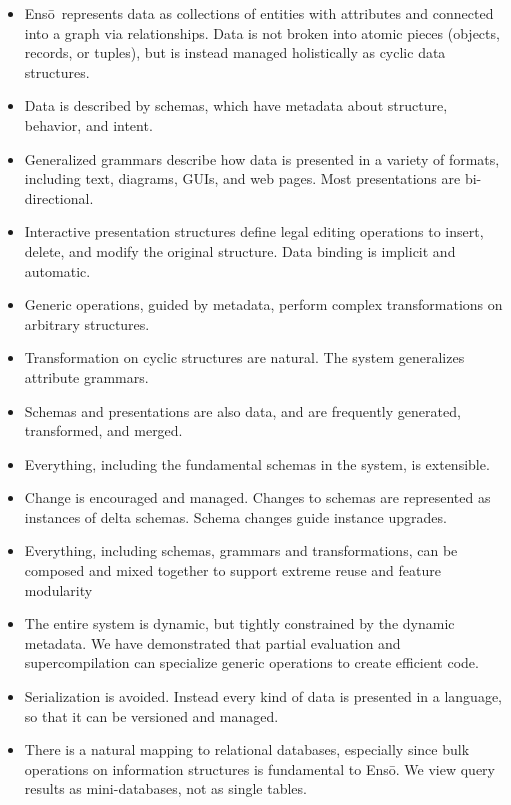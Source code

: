 \documentclass[11pt]{article}
\newcommand{\Enso}{Ens\={o}}
\begin{document}
\begin{itemize}

\item \Enso\ represents data as collections of entities with attributes
and connected into a graph via relationships. 
Data is not broken into atomic pieces (objects, records, or tuples), but is
instead managed holistically as cyclic data structures.

\item Data is described by schemas, which have 
metadata about structure, behavior, and intent.

\item Generalized grammars describe how
data is presented in a variety of formats, including
text, diagrams, GUIs, and web pages.
Most presentations are bi-directional.

\item Interactive presentation structures define legal editing operations
to insert, delete, and modify the original structure.
Data binding is implicit and automatic.

\item Generic operations, guided by metadata, perform
complex transformations on arbitrary structures.

\item Transformation on cyclic structures are natural.
The system generalizes attribute grammars.

\item Schemas and presentations are also data, and 
are frequently generated, transformed, and merged.

\item Everything, including the fundamental schemas
in the system, is extensible.

\item Change is encouraged and managed. Changes to
schemas are represented as instances of delta schemas.
Schema changes guide instance upgrades.

\item Everything, including schemas, grammars and
transformations, can be composed and mixed together
to support extreme reuse and feature modularity

\item The entire system is dynamic, but tightly 
constrained by the dynamic metadata. We have 
demonstrated that partial evaluation and supercompilation 
can specialize generic operations to create efficient 
code.

\item Serialization is avoided. Instead every kind of 
data is presented in a language, so that it can be 
versioned and managed.

\item There is a natural mapping to relational databases,
especially since bulk operations on information structures
is fundamental to \Enso. We view query results as 
mini-databases, not as single tables. 

\end{itemize}
\end{document}
